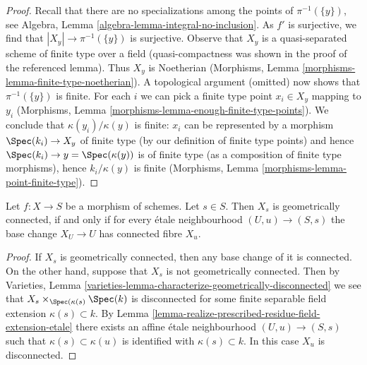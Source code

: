 \begin{proof}
Recall that there are no specializations among the points of $\pi^{-1}(\{y\})$,
see Algebra, Lemma \ref{algebra-lemma-integral-no-inclusion}.
As $f'$ is surjective, we find that $|X_y| \to \pi^{-1}(\{y\})$ is surjective.
Observe that $X_y$ is a quasi-separated scheme of finite type
over a field (quasi-compactness was shown in the proof of the
referenced lemma). Thus $X_y$ is Noetherian
(Morphisms, Lemma \ref{morphisms-lemma-finite-type-noetherian}).
A topological argument (omitted) now shows that $\pi^{-1}(\{y\})$ is finite.
For each $i$ we can pick a finite type point $x_i \in X_y$ mapping to $y_i$
(Morphisms, Lemma \ref{morphisms-lemma-enough-finite-type-points}).
We conclude that $\kappa(y_i)/\kappa(y)$ is finite:
$x_i$ can be represented by a morphism $\Spec(k_i) \to X_y$
of finite type (by our definition of finite type points)
and hence $\Spec(k_i) \to y = \Spec(\kappa(y))$ is of finite type
(as a composition of finite type morphisms),
hence $k_i/\kappa(y)$ is finite (Morphisms, Lemma
\ref{morphisms-lemma-point-finite-type}).
\end{proof}

\begin{lemma}
\label{lemma-characterize-geometrically-connected-fibres}
Let $f : X \to S$ be a morphism of schemes.
Let $s \in S$. Then $X_s$ is geometrically connected, if and
only if for every \'etale neighbourhood $(U, u) \to (S, s)$
the base change $X_U \to U$ has connected fibre $X_u$.
\end{lemma}

\begin{proof}
If $X_s$ is geometrically connected, then any base change of it is connected.
On the other hand, suppose that $X_s$ is not geometrically connected.
Then by
Varieties, Lemma
\ref{varieties-lemma-characterize-geometrically-disconnected}
we see that $X_s \times_{\Spec(\kappa(s)} \Spec(k)$ is
disconnected for some
finite separable field extension $\kappa(s) \subset k$. By
Lemma \ref{lemma-realize-prescribed-residue-field-extension-etale}
there exists an affine \'etale neighbourhood $(U, u) \to (S, s)$ such that
$\kappa(s) \subset \kappa(u)$ is identified with $\kappa(s) \subset k$.
In this case $X_u$ is disconnected.
\end{proof}

